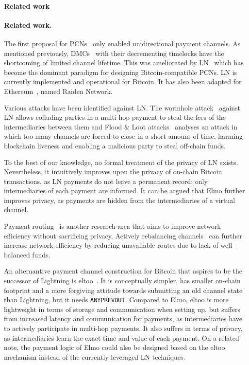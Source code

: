 \makeatletter%
%
  {\paragraph{Related work}}%
  {\paragraph{Related work.}}%
\makeatother%
 The first proposal for PCNs~\cite{spilman} only enabled
 unidirectional payment channels. As mentioned previously, DMCs~\cite{decker}
 with their decrementing timelocks have the shortcoming of limited channel
 lifetime. This was ameliorated by LN~\cite{lightning} which has become the dominant paradigm for designing Bitcoin-compatible PCNs.
 LN is currently implemented and operational for
  Bitcoin. It has also been adapted for Ethereum~\cite{wood2014ethereum}, named Raiden Network.

Various attacks have been identified against LN. The wormhole
  attack~\cite{DBLP:conf/ndss/MalavoltaMSKM19} against LN allows
  colluding parties in a multi-hop payment to steal the fees of the
  intermediaries between them and Flood \& Loot attacks~\cite{10.1145/3419614.3423248}
  analyses an attack in which too many channels are forced to
  close in a short amount of time, harming blockchain liveness and enabling
  a malicious party to steal off-chain funds.

  To the best of our knowledge, no formal treatment of the privacy of LN exists.
  Nevertheless, it intuitively improves upon the privacy of on-chain Bitcoin
  transactions, as LN payments do not leave a permanent record: only
  intermediaries of each payment are informed. It can be argued that Elmo
  further improves privacy, as payments are hidden from
  the intermediaries of a virtual channel.

  Payment routing~\cite{spider,prihodko2016flare,lee2020routee} is another research area that aims to improve network efficiency without sacrificing  privacy. Actively rebalancing channels~\cite{DBLP:conf/ccs/KhalilG17} can
  further increase network efficiency by reducing unavailable routes due to lack of well-balanced funds.

  An alternantive payment channel construction for Bitcoin that aspires to be
  the successor of Lightning is eltoo~\cite{eltoo}. It is conceptually simpler,
  has smaller on-chain footprint and a more forgiving attitude towards
  submitting an old channel state than Lightning, but it needs
  \texttt{ANYPREVOUT}. Compared to Elmo, eltoo is more lightweight in terms of
  storage and communication when setting up, but suffers from increased latency
  and communication for payments, as intermediaries have to actively participate
  in multi-hop payments. It also suffers in terms of privacy, as intermediaries
  learn the exact time and value of each payment. On a related note, the payment
  logic of Elmo could also be designed based on the eltoo mechanism instead of
  the currently leveraged LN techniques.

